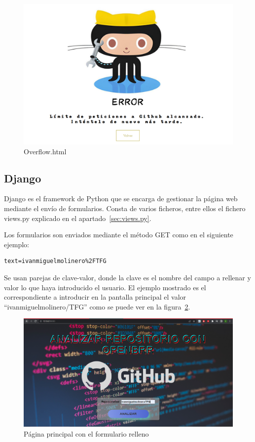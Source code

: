 \documentclass[a4paper, 12pt]{book}
\begin{document}
\begin{figure}
    \centering
    \includegraphics[bb=0 0 800 600, width=12cm, keepaspectratio]{img/overflow.png}
    \caption{Overflow.html}\label{fig:error overflow}
\end{figure}

\subsection{Django}

Django es el framework de Python que se encarga de gestionar la página web mediante el envío de formularios. Consta de varios ficheros, entre ellos el fichero views.py explicado en el apartado~\ref{sec:views.py}.

Los formularios son enviados mediante el método GET como en el siguiente ejemplo:

\begin{verbatim}
text=ivanmiguelmolinero%2FTFG
\end{verbatim}

Se usan parejas de clave-valor, donde la clave es el nombre del campo a rellenar y valor lo que haya introducido el usuario. El ejemplo mostrado es el correspondiente a introducir en la pantalla principal el valor ``ivanmiguelmolinero/TFG'' como se puede ver en la figura~\ref{fig:ivanmiguelmolinero/TFG}.

\begin{figure}
    
    \includegraphics[bb=0 0 800 600, width=12cm, keepaspectratio]{img/maintfg.png}
    \caption{Página principal con el formulario relleno}\label{fig:ivanmiguelmolinero/TFG}
\end{figure}
\end{document}
